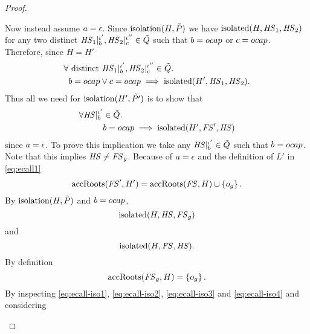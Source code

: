 \begin{proof}
\begin{description}
\begin{description}
          Now instead assume $a = \mbox{$\epsilon$}$. Since $\mbox{$\mathrm{isolation}$}(H, \tilde{P})$ we have
          $\mbox{$\mathrm{isolated}$}(H, \mathit{HS}_1, \mathit{HS}_2)$ for any two distinct $\mathit{HS}_1|_b^{\iota'},
          \mathit{HS}_2|_c^{\iota''}
          \in \tilde{Q}$ such that $b = \mbox{$ocap$}$ or $c = \mbox{$ocap$}$. Therefore, since $H = H'$
          \begin{equation}
            \begin{aligned}
              \forall &\text{ distinct } \mathit{HS}_1|_b^{\iota'}, \mathit{HS}_2|_c^{\iota''} \in \tilde{Q}. \\ 
              & b = \mbox{$ocap$} \lor c = \mbox{$ocap$} \implies \mbox{$\mathrm{isolated}$}(H', \mathit{HS}_1, \mathit{HS}_2).
            \end{aligned}
          \end{equation}
          Thus all we need for $\mbox{$\mathrm{isolation}$}(H', \tilde{P'})$ is to show that
          \begin{equation}
            \begin{aligned}
              \forall \mathit{HS}|_b^{\iota'} &\in \tilde{Q} . \\
              &b = \mbox{$ocap$} \implies \mbox{$\mathrm{isolated}$}(H', \mathit{FS}', \mathit{HS})
            \end{aligned}
          \end{equation}
          since $a = \mbox{$\epsilon$}$. To prove this implication we take any
          $\mathit{HS}|_b^{\iota'} \in
          \tilde{Q}$ such that $b = \mbox{$ocap$}$. Note that this implies $\mathit{HS} \neq
          \mathit{FS}_g$. Because of $a = \mbox{$\epsilon$}$ and the definition of $L'$ in
          \eqref{eq:ecall1}
          \begin{equation} \label{eq:ecall-iso1}
            \mbox{$\mathrm{accRoots}$}(\mathit{FS}', H') = \mbox{$\mathrm{accRoots}$}(\mathit{FS}, H) \cup \left\{ o_g \right\}.
          \end{equation}
          By $\mbox{$\mathrm{isolation}$}(H, \tilde{P})$  and $b = \mbox{$ocap$}$,
          \begin{equation} \label{eq:ecall-iso2}
            \mbox{$\mathrm{isolated}$}(H, \mathit{HS}, \mathit{FS}_g)
          \end{equation}
          and
          \begin{equation} \label{eq:ecall-iso4}
            \mbox{$\mathrm{isolated}$}(H, \mathit{FS}, \mathit{HS}).
          \end{equation}
          By definition
          \begin{equation} \label{eq:ecall-iso3}
            \mbox{$\mathrm{accRoots}$}(\mathit{FS}_g, H) = \left\{o_g \right\}.
          \end{equation}
          By inspecting \eqref{eq:ecall-iso1}, \eqref{eq:ecall-iso2},
          \eqref{eq:ecall-iso3} and \eqref{eq:ecall-iso4} and considering

\end{description}
\end{description}
\end{proof}
